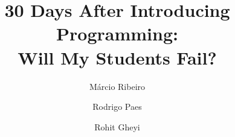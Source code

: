 \documentclass[review]{elsarticle}
\begin{document}
\begin{frontmatter}

\title{30 Days After Introducing Programming:\\Will My Students Fail?}



\author[ufal]{M\'{a}rcio Ribeiro}

\author[ufal]{Rodrigo Paes}

\author[ufcg]{Rohit Gheyi}

\address[ufal]{Federal University of Alagoas, Macei\'{o}, Brazil}
\address[ufcg]{Federal University of Campina Grande, Campina Grande, Brazil}


\end{frontmatter}
\end{document}
